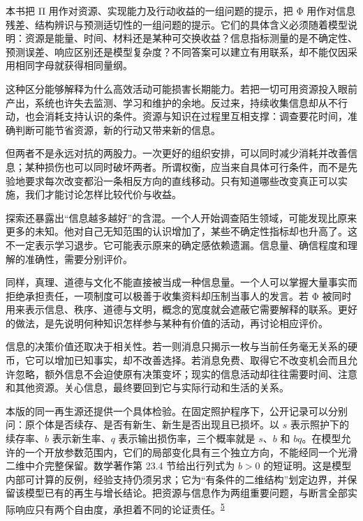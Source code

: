 \documentclass[
  11pt,
  oneside]{book}
\begin{document}
本书把 Π 用作对资源、实现能力及行动收益的一组问题的提示，把 Φ 用作对信息残差、结构辨识与预测适切性的一组问题的提示。它们的具体含义必须随着模型说明：资源是能量、时间、材料还是某种可交换收益？信息指标测量的是不确定性、预测误差、响应区别还是模型复杂度？不同答案可以建立有用联系，却不能仅因采用相同字母就获得相同量纲。

这种区分能够解释为什么高效活动可能损害长期能力。若把一切可用资源投入眼前产出，系统也许失去监测、学习和维护的余地。反过来，持续收集信息却从不行动，也会消耗支持认识的条件。资源与知识在过程里互相支撑：调查要花时间，准确判断可能节省资源，新的行动又带来新的信息。

但两者不是永远对抗的两股力。一次更好的组织安排，可以同时减少消耗并改善信息；某种损伤也可以同时破坏两者。所谓权衡，应当来自具体可行条件，而不是先验地要求每次改变都沿一条相反方向的直线移动。只有知道哪些改变真正可以实施，我们才能讨论怎样比较代价与收益。

探索还暴露出``信息越多越好''的含混。一个人开始调查陌生领域，可能发现比原来更多的未知。他对自己无知范围的认识增加了，某些不确定性指标却也升高了。这不一定表示学习退步。它可能表示原来的确定感依赖遗漏。信息量、确信程度和理解的准确性，需要分别评价。

同样，真理、道德与文化不能直接被当成一种信息量。一个人可以掌握大量事实而拒绝承担责任，一项制度可以极善于收集资料却压制当事人的发言。若 Φ 被同时用来表示信息、秩序、道德与文明，概念的宽度就会遮蔽它需要解释的联系。更好的做法，是先说明何种知识怎样参与某种有价值的活动，再讨论相应评价。

信息的决策价值还取决于相关性。若一则消息只揭示一枚与当前任务毫无关系的硬币，它可以增加已知事实，却不改善选择。若消息免费、取得它不改变机会而且允许忽略，额外信息不会迫使原有决策变坏；现实的信息活动却往往需要时间、注意和其他资源。关心信息，最终要回到它与实际行动和生活的关系。

本版的同一再生源还提供一个具体检验。在固定照护程序下，公开记录可以分别问：原个体是否续存、是否有新生、新生是否出现且已损坏。以 \(s\) 表示照护下的续存率、\(b\) 表示新生率、\(q\) 表示输出损伤率，三个概率就是 \(s\)、\(b\) 和 \(bq\)。在模型允许的一个开放参数范围内，它们的局部变化具有三个独立方向，不能经同一个光滑二维中介完整保留。数学著作第 23.4 节给出行列式为 \(b>0\) 的短证明。这是模型内部可计算的反例，经验支持仍须另求；它为``有条件的二维结构''划定边界，并保留该模型已有的再生与增长结论。把资源与信息作为两组重要问题，与断言全部实际响应只有两个自由度，承担着不同的论证责任。\textsuperscript{\hyperlink{ph-note-5}{5}}

\begingroup{}
\end{document}

